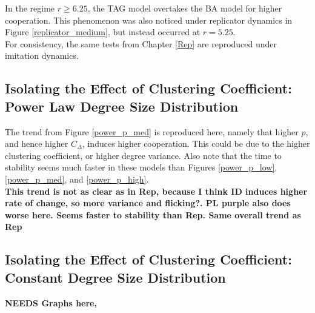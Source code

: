 In the regime $r\geq 6.25$, the TAG model overtakes the BA model for higher cooperation. This phenomenon was also noticed under replicator dynamics in Figure \ref{replicator_medium}, but instead occurred at $r=5.25$. \\

For consistency, the same tests from Chapter \ref{Rep} are reproduced under imitation dynamics. \\

\subsection{Isolating the Effect of Clustering Coefficient: Power Law Degree Size Distribution}

\FloatBarrier
{}
\FloatBarrier
{} \FloatBarrier

The trend from Figure \ref{power_p_med} is reproduced here, namely that higher $p$, and hence higher $C_\Delta$, induces higher cooperation. This could be due to the higher clustering coefficient, or higher degree variance. Also note that the time to stability seems much faster in these models than Figures \ref{power_p_low}, \ref{power_p_med}, and \ref{power_p_high}. \\
\textbf{This trend is not as clear as in Rep, because I think ID induces higher rate of change, so more variance and flicking?. PL purple also does worse here. Seems faster to stability than Rep. Same overall trend as Rep}

\subsection{Isolating the Effect of Clustering Coefficient: Constant Degree Size Distribution}
\textbf{NEEDS Graphs here, }
\FloatBarrier
 


